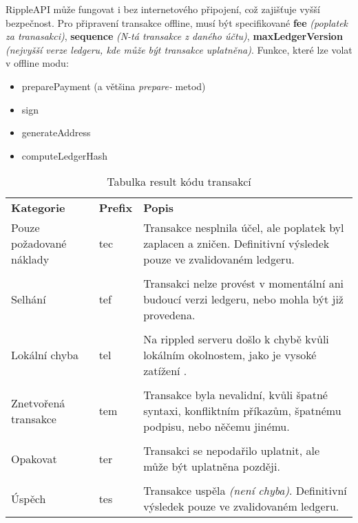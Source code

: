 \documentclass[hidelinks, titlepage]{article}
\begin{document}
RippleAPI může fungovat i bez internetového připojení, což zajišťuje vyšší bezpečnost. Pro připravení transakce offline, musí být specifikované \textbf{fee} \textit{(poplatek za tranasakci)}, \textbf{sequence} \textit{(N-tá transakce z daného účtu)}, \textbf{maxLedgerVersion} \textit{(nejvyšší verze ledgeru, kde může být transakce uplatněna)}. Funkce, které lze volat v offline modu:
\begin{itemize}
\item preparePayment (a většina \textit{prepare-} metod)
\item sign
\item generateAddress
\item computeLedgerHash \cite{trans}
\end{itemize}

\clearpage
\begin{table}[]
\begin{tabular}{lll}
\textbf{Kategorie}       & \textbf{Prefix} & \textbf{Popis}                                                                                                    \\
\parbox{3cm}{Pouze požadované náklady} & tec             & \parbox{6.5cm}{Transakce nesplnila účel, ale poplatek byl zaplacen a zničen. Definitivní výsledek pouze ve zvalidovaném ledgeru.} \\ \\
Selhání                  & tef             & \parbox{6.5cm}{Transakci nelze provést v momentální ani budoucí verzi ledgeru, nebo mohla být již provedena.}                     \\ \\
Lokální chyba            & tel             & \parbox{6.5cm}{Na rippled serveru došlo k chybě kvůli lokálním okolnostem, jako je vysoké zatížení                              .} \\ \\
Znetvořená transakce     & tem             & \parbox{6.5cm}{Transakce byla nevalidní, kvůli špatné syntaxi, konfliktním příkazům, špatnému podpisu, nebo něčemu jinému.}       \\ \\
Opakovat                 & ter             & \parbox{6.5cm}{Transakci se nepodařilo uplatnit, ale může být uplatněna později.}                                                 \\ \\
Úspěch                   & tes             & \parbox{6.5cm}{Transakce uspěla \textit{(není chyba)}. Definitivní výsledek pouze ve zvalidovaném ledgeru.}                             
\end{tabular}
\caption{Tabulka result kódu transakcí \cite{result}}
\label{table:result}
\end{table}
\end{document}
